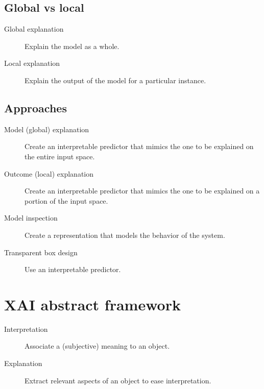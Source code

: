 \subsection{Global vs local}

\begin{description}
    \item[Global explanation] 
        Explain the model as a whole.

    \item[Local explanation] 
        Explain the output of the model for a particular instance.
\end{description}


\subsection{Approaches}

\begin{description}
    \item[Model (global) explanation] 
        Create an interpretable predictor that mimics the one to be explained on the entire input space.
    
    \item[Outcome (local) explanation] 
        Create an interpretable predictor that mimics the one to be explained on a portion of the input space.

    \item[Model inspection] 
        Create a representation that models the behavior of the system.

    \item[Transparent box design] 
        Use an interpretable predictor.
\end{description}



\section{XAI abstract framework}

\begin{description}
    \item[Interpretation] 
        Associate a (subjective) meaning to an object.
    
    \item[Explanation] 
        Extract relevant aspects of an object to ease interpretation.
\end{description}

